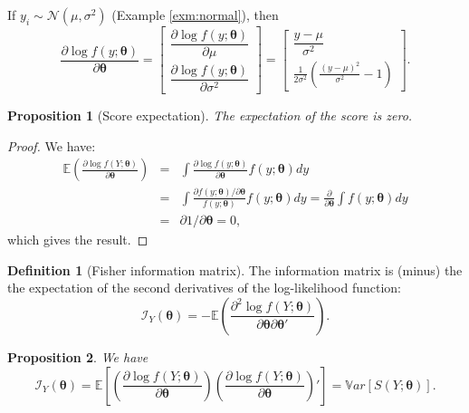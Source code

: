 \documentclass[
  12pt,
]{book}
\newtheorem{proposition}{Proposition}[chapter]
\theoremstyle{definition}
\newtheorem{definition}{Definition}[chapter]
\theoremstyle{definition}
\theoremstyle{definition}
\theoremstyle{definition}
\theoremstyle{remark}
\begin{document}
If \(y_i \sim \mathcal{N}(\mu,\sigma^2)\) (Example \ref{exm:normal}), then
\[
\frac{\partial \log f(y;\boldsymbol\theta)}{\partial \boldsymbol\theta} =
\left[\begin{array}{c}
\dfrac{\partial \log f(y;\boldsymbol\theta)}{\partial \mu}\\
\dfrac{\partial \log f(y;\boldsymbol\theta)}{\partial \sigma^2}
\end{array}\right] =
\left[\begin{array}{c}
\dfrac{y-\mu}{\sigma^2}\\
\frac{1}{2\sigma^2}\left(\frac{(y-\mu)^2}{\sigma^2}-1\right)
\end{array}\right].
\]

\begin{proposition}[Score expectation]
\protect\hypertarget{prp:score}{}\label{prp:score}The expectation of the score is zero.
\end{proposition}

\begin{proof}
We have:
\begin{eqnarray*}
\mathbb{E}\left(\frac{\partial \log f(Y;\boldsymbol\theta)}{\partial \boldsymbol\theta}\right) &=&
\int \frac{\partial \log f(y;\boldsymbol\theta)}{\partial \boldsymbol\theta} f(y;\boldsymbol\theta) dy \\
&=& \int \frac{\partial f(y;\boldsymbol\theta)/\partial \boldsymbol\theta}{f(y;\boldsymbol\theta)} f(y;\boldsymbol\theta) dy =
\frac{\partial}{\partial \boldsymbol\theta} \int f(y;\boldsymbol\theta) dy\\
&=&\partial 1 /\partial \boldsymbol\theta = 0,
\end{eqnarray*}
which gives the result.
\end{proof}

\begin{definition}[Fisher information matrix]
\protect\hypertarget{def:Fisher}{}\label{def:Fisher}The information matrix is (minus) the the expectation of the second derivatives of the log-likelihood function:
\[
\mathcal{I}_Y(\boldsymbol\theta) = - \mathbb{E} \left( \frac{\partial^2 \log f(Y;\boldsymbol\theta)}{\partial \boldsymbol\theta \partial \boldsymbol\theta'} \right).
\]
\end{definition}

\begin{proposition}
\protect\hypertarget{prp:Fisher}{}\label{prp:Fisher}We have
\[
\mathcal{I}_Y(\boldsymbol\theta) = \mathbb{E} \left[ \left( \frac{\partial \log f(Y;\boldsymbol\theta)}{\partial \boldsymbol\theta} \right)
\left( \frac{\partial \log f(Y;\boldsymbol\theta)}{\partial \boldsymbol\theta} \right)' \right] = \mathbb{V}ar[S(Y;\boldsymbol\theta)].
\]
\end{proposition}
\end{document}
